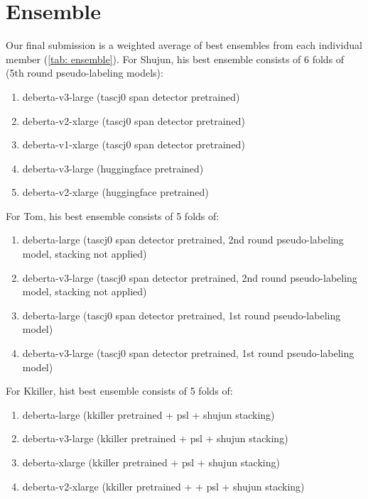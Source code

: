 \documentclass[11pt]{article} %
\begin{document}
\section{Ensemble}

Our final submission is a weighted average of best ensembles from each individual member (\autoref{tab: ensemble}). For Shujun, his best ensemble consists of 6 folds of (5th round pseudo-labeling models):
\begin{enumerate}
\item deberta-v3-large (tascj0 span detector pretrained)
\item deberta-v2-xlarge (tascj0 span detector pretrained)
\item deberta-v1-xlarge (tascj0 span detector pretrained)
\item deberta-v3-large (huggingface pretrained)
\item deberta-v2-xlarge (huggingface pretrained)
\end{enumerate}


For Tom, his best ensemble consists of 5 folds of:
\begin{enumerate}
\item deberta-large (tascj0 span detector pretrained, 2nd round pseudo-labeling model, stacking not applied)
\item deberta-v3-large (tascj0 span detector pretrained, 2nd round pseudo-labeling model, stacking not applied)
\item deberta-large (tascj0 span detector pretrained, 1st round pseudo-labeling model)
\item deberta-v3-large (tascj0 span detector pretrained, 1st round pseudo-labeling model)
\end{enumerate}

For Kkiller, hist best ensemble consists of 5 folds of:
\begin{enumerate}
\item deberta-large (kkiller pretrained + psl + shujun stacking)
\item deberta-v3-large (kkiller pretrained + psl + shujun stacking)
\item deberta-xlarge (kkiller pretrained + psl  + shujun stacking)
\item deberta-v2-xlarge (kkiller pretrained + + psl + shujun stacking)
\end{enumerate}
\end{document}

